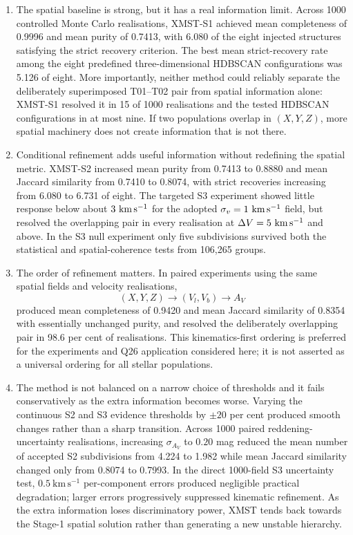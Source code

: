 \documentclass[fleqn,usenatbib]{rasti}
\begin{document}
\begin{enumerate}

\item The spatial baseline is strong, but it has a real information limit. Across 1000 controlled Monte Carlo realisations, XMST-S1 achieved mean completeness of 0.9996 and mean purity of 0.7413, with 6.080 of the eight injected structures satisfying the strict recovery criterion. The best mean strict-recovery rate among the eight predefined three-dimensional HDBSCAN configurations was 5.126 of eight. More importantly, neither method could reliably separate the deliberately superimposed T01--T02 pair from spatial information alone: XMST-S1 resolved it in 15 of 1000 realisations and the tested HDBSCAN configurations in at most nine. If two populations overlap in $(X,Y,Z)$, more spatial machinery does not create information that is not there.

\item Conditional refinement adds useful information without redefining the spatial metric. XMST-S2 increased mean purity from 0.7413 to 0.8880 and mean Jaccard similarity from 0.7410 to 0.8074, with strict recoveries increasing from 6.080 to 6.731 of eight. The targeted S3 experiment showed little response below about $3~{\rm km\,s^{-1}}$ for the adopted $\sigma_v=1~{\rm km\,s^{-1}}$ field, but resolved the overlapping pair in every realisation at $\Delta V=5~{\rm km\,s^{-1}}$ and above. In the S3 null experiment only five subdivisions survived both the statistical and spatial-coherence tests from 106,265 groups.

\item The order of refinement matters. In paired experiments using the same spatial fields and velocity realisations,
\[
(X,Y,Z)\rightarrow(V_l,V_b)\rightarrow A_V
\]
produced mean completeness of 0.9420 and mean Jaccard similarity of 0.8354 with essentially unchanged purity, and resolved the deliberately overlapping pair in 98.6 per cent of realisations. This kinematics-first ordering is preferred for the experiments and Q26 application considered here; it is not asserted as a universal ordering for all stellar populations.

\item The method is not balanced on a narrow choice of thresholds and it fails conservatively as the extra information becomes worse. Varying the continuous S2 and S3 evidence thresholds by $\pm20$ per cent produced smooth changes rather than a sharp transition. Across 1000 paired reddening-uncertainty realisations, increasing $\sigma_{A_V}$ to $0.20$ mag reduced the mean number of accepted S2 subdivisions from 4.224 to 1.982 while mean Jaccard similarity changed only from 0.8074 to 0.7993. In the direct 1000-field S3 uncertainty test, $0.5~\mathrm{km\,s^{-1}}$ per-component errors produced negligible practical degradation; larger errors progressively suppressed kinematic refinement. As the extra information loses discriminatory power, XMST tends back towards the Stage-1 spatial solution rather than generating a new unstable hierarchy.


\end{enumerate}
\end{document}
